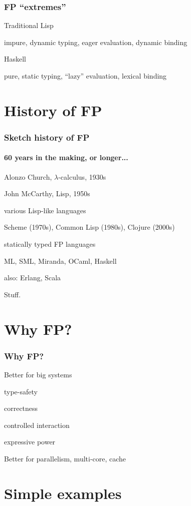 \begin{frame}
\frametitle{FP ``extremes''}
\bi
\item Traditional Lisp
\bi
\item impure, dynamic typing, eager evaluation, dynamic binding
\ei
\item Haskell
\bi
\item pure, static typing, ``lazy'' evaluation, lexical binding
\ei
\ei
\end{frame}

\section{History of FP}

\begin{frame}
\frametitle{Sketch history of FP}
\framesubtitle{60 years in the making, or longer...}
\bi
\item Alonzo Church, $\lambda$-calculus, 1930s
\item John McCarthy, Lisp, 1950s
\item various Lisp-like languages
\bi
\item Scheme (1970s), Common Lisp (1980s), Clojure (2000s)
\ei
\item statically typed FP languages
\bi
\item ML, SML, Miranda, OCaml, Haskell
\ei
\item also: Erlang, Scala
\ei
\begin{annotation}
Stuff.
\end{annotation}
\end{frame}

\section{Why FP?}

\begin{frame}
\frametitle{Why FP?}
\bi
\item Better for big systems
\bi
\item type-safety
\item correctness
\item controlled interaction
\item expressive power
\ei
\item Better for parallelism, multi-core, cache
\ei
\end{frame}

\section{Simple examples}

